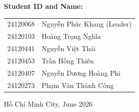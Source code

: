 \begin{titlepage}
\vspace{0.7cm}
\begin{center}
\textbf{Student ID and Name:}\\
\begin{tabular}{ll}
24120068 & Nguyễn Phúc Khang (Leader) \\
24120103 & Hoàng Trọng Nghĩa \\
24120441 & Nguyễn Việt Thái \\
24120453 & Trần Hồng Thiên \\
24120407 & Nguyễn Dương Hoàng Phi \\
24120273 & Phạm Văn Thành Công \\
\end{tabular}
\end{center}

\vspace{0.5cm}

\begin{center}
{\footnotesize Hồ Chí Minh City, June 2026}
\end{center}
\end{titlepage}
